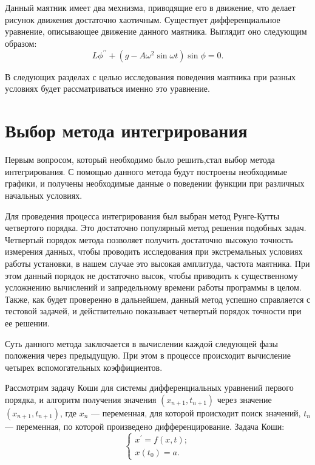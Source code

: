 \documentclass[a4paper,12pt]{article}
\begin{document}
	Данный маятник имеет два мехнизма, приводящие его в движение, что делает
	рисунок движения достаточно хаотичным. Существует дифференциальное 
	уравнение, описывающее движение данного маятника. Выглядит оно следующим
	образом:
	\begin{equation}L\phi^{\prime\prime} + (g - A\omega^2 \sin\omega t) \sin\phi = 0.\end{equation}

	В следующих разделах с целью исследования поведения маятника при разных
	условиях будет рассматриваться именно это уравнение.

	\newpage
	\section{Выбор метода интегрирования}
	Первым вопросом, который необходимо было решить,стал выбор метода 
	интегрирования. С помощью данного метода будут построены необходимые 
	графики, и получены необходимые данные о поведении функции при различных
	начальных условиях.

	Для проведения процесса интегрирования был выбран метод Рунге-Кутты 
	четвертого порядка. Это достаточно популярный метод решения подобных 
	задач. Четвертый порядок метода позволяет получить достаточно высокую
	точность измерения данных, чтобы проводить исследования при экстремальных 
	условиях работы установки, в нашем случае это высокая амплитуда, частота
	маятника. При этом данный порядок не достаточно высок, чтобы приводить 
	к существенному усложнению вычислений и запредельному времени работы 
	программы в целом. Также, как будет проверенно в дальнейшем, данный метод
	успешно справляется с тестовой задачей, и действительно показывает 
	четвертый порядок точности при ее решении.

	Суть данного метода заключается в вычислении каждой следующей фазы 
	положения через предыдущую. При этом в процессе происходит вычисление
	четырех вспомогательных коэффициентов.

	Рассмотрим задачу Коши для системы дифференциальных уравнений первого 
	порядка, и алгоритм получения значения $(x_{n+1}, t_{n+1})$ через 
	значение $(x_{n+1}, t_{n+1})$, где $x_n$ --- переменная, для которой
	происходит поиск значений, $t_n$ --- переменная, по которой произведено 
	дифференцирование. Задача Коши:
	\begin{equation}
		\begin{cases}
			x^\prime = f(x, t); \\
			x(t_0) = a.
		\end{cases}
	\end{equation}
\end{document}
